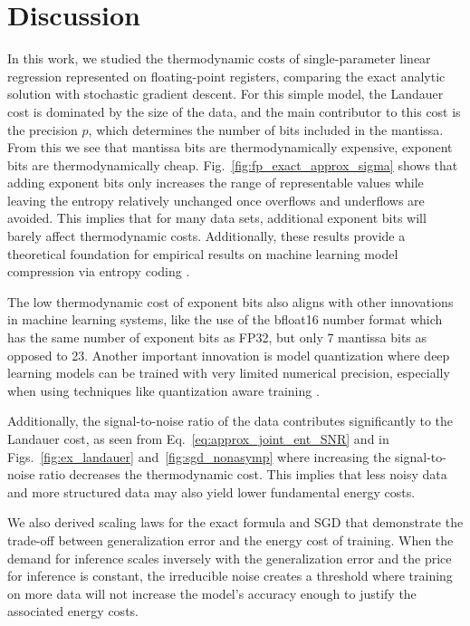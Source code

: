 \documentclass[12pt,onecolumn, margin=1in]{IEEEtran}
\begin{document}
\section{Discussion}\label{sec:disc}



In this work, we studied the thermodynamic costs of single-parameter linear regression represented on floating-point registers, comparing the exact analytic solution with stochastic gradient descent.
For this simple model, the Landauer cost is dominated by the size of the data, and the main contributor to this cost is the precision $p$, which determines the number of bits included in the mantissa. 
From this we see that mantissa bits are thermodynamically expensive, exponent bits are thermodynamically cheap. Fig.~\ref{fig:fp_exact_approx_sigma} shows that adding exponent bits only increases the range of representable values while leaving the entropy relatively unchanged once overflows and underflows are avoided. 
This implies that for many data sets, additional exponent bits will barely affect thermodynamic costs. 
Additionally, these results provide a theoretical foundation for empirical results on machine learning model compression via entropy coding \cite{bordawekar2022efloatentropycodedfloatingpoint, hao_neuzip_2024}.

The low thermodynamic cost of exponent bits also aligns with other innovations in machine learning systems, like the use of the bfloat16 number format \cite{googleBFloat16Secret} which has the same number of exponent bits as FP32, but only 7 mantissa bits as opposed to 23. 
Another important innovation is model quantization \cite{gholami2021surveyquantizationmethodsefficient, gupta2015deeplearninglimitednumerical, krishnamoorthi2018quantizingdeepconvolutionalnetworks} where deep learning models can be trained with very limited numerical precision, especially when using techniques like quantization aware training \cite{ash2024efqat, hasan2024optimizinglargelanguagemodels}.

Additionally, the signal-to-noise ratio of the data contributes significantly to the Landauer cost, as seen from Eq.~\eqref{eq:approx_joint_ent_SNR} and in Figs.~\ref{fig:ex_landauer} and~\ref{fig:sgd_nonasymp} where increasing the signal-to-noise ratio decreases the thermodynamic cost. This implies that less noisy data and more structured data may also yield lower fundamental energy costs.

We also derived scaling laws for the exact formula and SGD that demonstrate the trade-off between generalization error and the energy cost of training. When the demand for inference scales inversely with the generalization error and the price for inference is constant, the irreducible noise creates a threshold where training on more data will not increase the model's accuracy enough to justify the associated energy costs.
\end{document}
